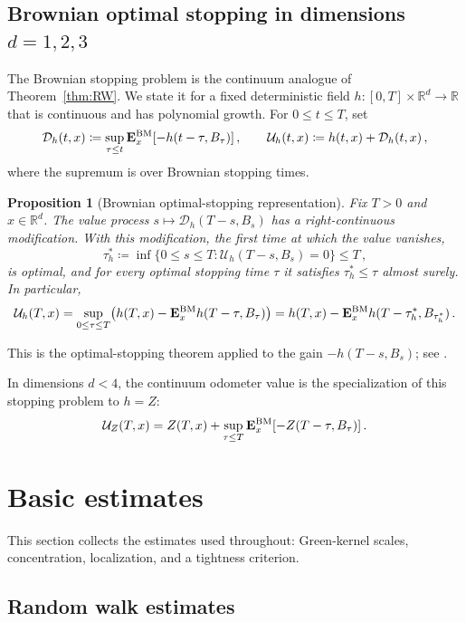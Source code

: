 \documentclass[11pt]{amsart}
\theoremstyle{plain}
\newtheorem{proposition}[theorem]{Proposition}
\theoremstyle{definition}
\newcommand{\R}{\mathbb{R}}
\begin{document}
	\subsection{Brownian optimal stopping in dimensions \texorpdfstring{$d=1,2,3$}{d=1,2,3}}\label{ssec:brownian-stopping}

	The Brownian stopping problem is the continuum analogue of
	Theorem~\ref{thm:RW}. We state it for a fixed deterministic field
	$h:[0,T]\times\R^d\to\R$ that is continuous and has polynomial growth. For
	$0\leq t\leq T$, set
	\[
		\mathcal D_h(t,x)\coloneqq
		\sup_{\tau\leq t}\mathbf E_x^{\rm BM}[-h(t-\tau,B_\tau)]\, ,
		\qquad
		\mathcal U_h(t,x)\coloneqq h(t,x)+\mathcal D_h(t,x)\, ,
	\]
	where the supremum is over Brownian stopping times.

	\begin{proposition}[Brownian optimal-stopping representation]\label{prop:brownian-os}
		Fix $T>0$ and $x\in\R^d$. The value process
		$s\mapsto \mathcal D_h(T-s,B_s)$ has a right-continuous modification. With
		this modification, the first time at which the value vanishes,
		\[
			\tau_h^*\coloneqq \inf\{0\leq s\leq T:\mathcal U_h(T-s,B_s)=0\}\leq T\, ,
		\]
		is optimal, and for every optimal stopping time $\tau$ it satisfies
		$\tau_h^*\leq\tau$ almost surely. In particular,
		\[
			\mathcal U_h(T,x)
			=
			\sup_{0\leq\tau\leq T}\bigl(h(T,x)-\mathbf E_x^{\rm BM} h(T-\tau,B_\tau)\bigr)
			=
			h(T,x)-\mathbf E_x^{\rm BM} h(T-\tau_h^*,B_{\tau_h^*})\, .
		\]
	\end{proposition}
	This is the optimal-stopping theorem applied to the gain $-h(T-s,B_s)$; see \citet[Theorem~2.2]{PeskirShiryaev}.

	In dimensions $d<4$, the continuum odometer value is the specialization of
	this stopping problem to $h=Z$:
	\begin{equation}\label{eq:continuum-membrane-stopping-value}
		\mathcal U_Z(T,x)
		=
		Z(T,x)+\sup_{\tau\leq T}\mathbf E_x^{\rm BM}[-Z(T-\tau,B_\tau)]\, .
	\end{equation}

\section{Basic estimates}\label{sec:estimates}

		This section collects the estimates used throughout: Green-kernel scales,
		concentration, localization, and a tightness criterion.


	\subsection{Random walk estimates}\label{ssec:green-estimates}
\end{document}
